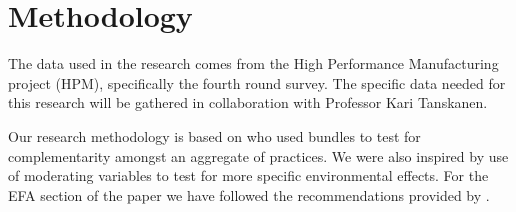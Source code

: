 \section{Methodology}
The data used in the research comes from the High Performance Manufacturing project (HPM), specifically the fourth round survey. The specific data needed for this research will be gathered in collaboration with Professor Kari Tanskanen.


Our research methodology is based on \cite{furlanComplementarityLeanManufacturing2011} who used bundles to test for complementarity amongst an aggregate of practices. 
We were also inspired by \cite{maoLowCarbonSupply2017} use of moderating variables to test for more specific environmental effects. 
For the EFA section of the paper we have followed the recommendations provided by \cite{beaversPracticalConsiderationsUsing2013}.
